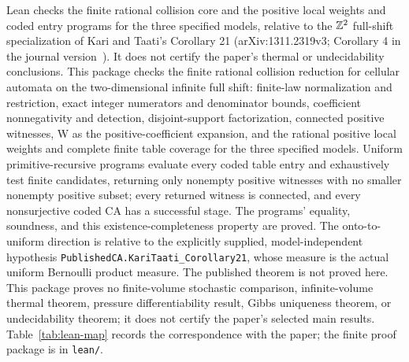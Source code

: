 Lean checks the finite rational collision core and the positive local weights and coded entry programs for the three specified models, relative to the $\mathbb Z^2$ full-shift specialization of Kari and Taati's Corollary 21 (arXiv:1311.2319v3; Corollary 4 in the journal version~\cite{KT}). It does not certify the paper's thermal or undecidability conclusions. This package checks the finite rational collision reduction for cellular automata on the two-dimensional infinite full shift: finite-law normalization and restriction, exact integer numerators and denominator bounds, coefficient nonnegativity and detection, disjoint-support factorization, connected positive witnesses, W as the positive-coefficient expansion, and the rational positive local weights and complete finite table coverage for the three specified models. Uniform primitive-recursive programs evaluate every coded table entry and exhaustively test finite candidates, returning only nonempty positive witnesses with no smaller nonempty positive subset; every returned witness is connected, and every nonsurjective coded CA has a successful stage. The programs' equality, soundness, and this existence-completeness property are proved. The onto-to-uniform direction is relative to the explicitly supplied, model-independent hypothesis \texttt{PublishedCA.\allowbreak KariTaati\_Corollary21}, whose measure is the actual uniform Bernoulli product measure. The published theorem is not proved here. This package proves no finite-volume stochastic comparison, infinite-volume thermal theorem, pressure differentiability result, Gibbs uniqueness theorem, or undecidability theorem; it does not certify the paper's selected main results. Table~\ref{tab:lean-map} records the correspondence with the paper; the finite proof package is in \texttt{lean/}.

